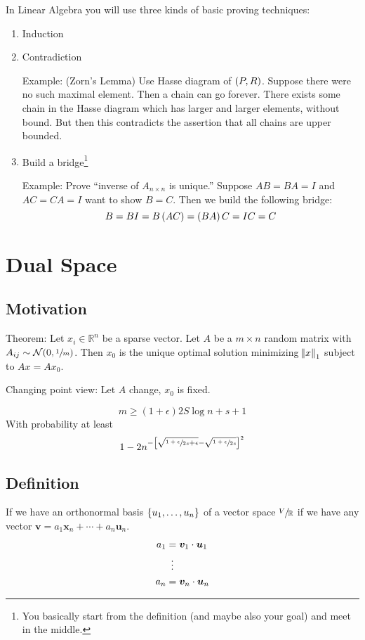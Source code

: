 \documentclass{article}
\newcommand{\RR}{\mathbb{R}}
\begin{document}
\begin{aside}[Recall]
  In Linear Algebra you will use three kinds of basic proving techniques:
  \begin{enumerate}
  \item Induction
  \item Contradiction

    Example: (Zorn's Lemma)
    Use Hasse diagram of \(\del{P, R}\).
    Suppose there were no such maximal element.
    Then a chain can go forever.
    There exists some chain in the Hasse diagram which has larger and larger elements, without bound.
    But then this contradicts the assertion that all chains are upper bounded.

  \item Build a bridge\footnote{You basically start from the definition (and maybe also your goal) and meet in the middle.}

    Example: Prove ``inverse of \(A_{n\times n}\) is unique.''
    Suppose \(AB =BA = I\) and \(AC = CA = I\) want to show  \(B = C\).
    Then we build the following bridge:
    \[B = BI = B\del{AC} = \del{BA}C = IC = C\]

  \end{enumerate}
\end{aside}

\section{Dual Space}
\subsection{Motivation}
Theorem: Let \(x_i \in \RR^n\) be a sparse vector.
Let \(A\) be a \(m \times n\) random matrix with \(A_{ij} \sim \mathcal{N}(0, \sfrac{1}{m})\).
Then \(x_0\) is the unique optimal solution minimizing \(\norm{x}_1\) subject to \(Ax = Ax_0\).

Changing point view:
Let \(A\) change, \(x_0\) is fixed.

\[m \geq (1 + \epsilon) 2S \log n + s + 1\]
With probability at least
\[1 - 2n^{-\sbr{\sqrt{\sfrac{1 + \epsilon}{2s} + \epsilon} - \sqrt{\sfrac{1 + \epsilon}{2s}}}^2}\]

\subsection{Definition}
\begin{aside}[Recall]
  If we have an orthonormal basis \(\set{u_1, \dots, u_n}\) of a vector space \(\sfrac{V}{\RR}\) if we have any vector \(\bm v = a_1 \bm x_n + \cdots + a_n \bm u_n\).
  \begin{align*}
    a_1 &= \bm v_1 \cdot \bm u_1\\
       &\hspace{0.5em}\vdots\\
    a_n &= \bm v_n \cdot \bm u_n
  \end{align*}
\end{aside}
\end{document}
